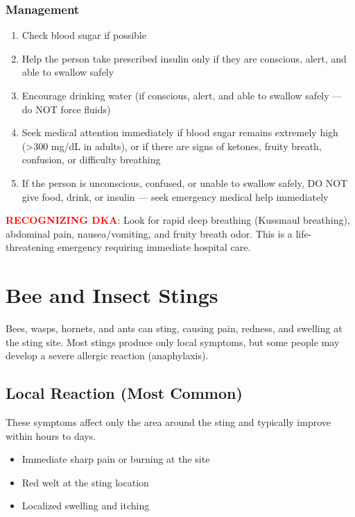 \subsubsection{Management}

\begin{enumerate}[leftmargin=*]
  \item Check blood sugar if possible
  \item Help the person take prescribed insulin only if they are conscious, alert, and able to swallow safely
  \item Encourage drinking water (if conscious, alert, and able to swallow safely — do NOT force fluids)
  \item Seek medical attention immediately if blood sugar remains extremely high (>300 mg/dL in adults), or if there are signs of ketones, fruity breath, confusion, or difficulty breathing
  \item If the person is unconscious, confused, or unable to swallow safely, DO NOT give food, drink, or insulin — seek emergency medical help immediately
\end{enumerate}
\noindent\textbf{\textcolor{red}{RECOGNIZING DKA}}: Look for rapid deep breathing (Kussmaul breathing), abdominal pain, nausea/vomiting, and fruity breath odor. This is a life-threatening emergency requiring immediate hospital care.


\section{Bee and Insect Stings}

Bees, wasps, hornets, and ants can sting, causing pain, redness, and swelling at the sting site. Most stings produce only local symptoms, but some people may develop a severe allergic reaction (anaphylaxis).

\subsection{Local Reaction (Most Common)}

These symptoms affect only the area around the sting and typically improve within hours to days.

\begin{itemize}[leftmargin=*]
  \item Immediate sharp pain or burning at the site
  \item Red welt at the sting location
  \item Localized swelling and itching
\end{itemize}


